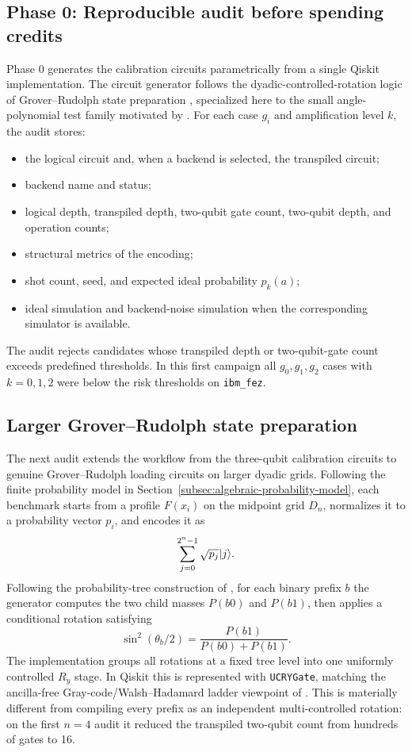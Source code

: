 \subsection{Phase 0: Reproducible audit before spending credits}

Phase 0 generates the calibration circuits parametrically from a single Qiskit
implementation. The circuit generator follows the dyadic-controlled-rotation
logic of Grover--Rudolph state preparation \cite{falco2026grproof}, specialized
here to the small angle-polynomial test family motivated by
\cite{chinesta2026encoding}. For each case \(g_i\) and amplification level \(k\),
the audit stores:
\begin{itemize}[leftmargin=*]
  \item the logical circuit and, when a backend is selected, the transpiled
        circuit;
  \item backend name and status;
  \item logical depth, transpiled depth, two-qubit gate count, two-qubit depth,
        and operation counts;
  \item structural metrics of the encoding;
  \item shot count, seed, and expected ideal probability \(p_k(a)\);
  \item ideal simulation and backend-noise simulation when the corresponding
        simulator is available.
\end{itemize}

The audit rejects candidates whose transpiled depth or two-qubit-gate count
exceeds predefined thresholds. In this first campaign all \(g_0,g_1,g_2\) cases
with \(k=0,1,2\) were below the risk thresholds on \texttt{ibm\_fez}.

\subsection{Larger Grover--Rudolph state preparation}

The next audit extends the workflow from the three-qubit calibration circuits
to genuine Grover--Rudolph loading circuits on larger dyadic grids. Following
the finite probability model in
Section~\ref{subsec:algebraic-probability-model}, each benchmark starts from a
profile \(F(x_i)\) on the midpoint grid \(D_n\), normalizes it to a probability
vector \(p_i\), and encodes it as
\[
  \sum_{j=0}^{2^n-1}\sqrt{p_j}\lvert j\rangle.
\]
Following the probability-tree construction of \cite{falco2026grproof}, for
each binary prefix \(b\) the generator computes the two child masses \(P(b0)\)
and \(P(b1)\), then applies a conditional rotation satisfying
\[
  \sin^2(\theta_b/2)=\frac{P(b1)}{P(b0)+P(b1)}.
\]
The implementation groups all rotations at a fixed tree level into one
uniformly controlled \(R_y\) stage. In Qiskit this is represented with
\texttt{UCRYGate}, matching the ancilla-free Gray-code/Walsh--Hadamard ladder
viewpoint of \cite{falco2026grproof}. This is materially different from
compiling every prefix as an independent multi-controlled rotation: on the
first \(n=4\) audit it reduced the transpiled two-qubit count from hundreds of
gates to 16.

